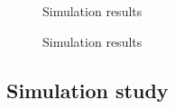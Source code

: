 \documentclass{article}
\begin{document}
\begin{figure}
  \ContinuedFloat
  \centering
  \caption{Simulation results}
\end{figure}

\begin{figure}
  \ContinuedFloat
  \centering
  \caption{Simulation results}
\end{figure}


\subsection{Simulation study}
\end{document}
